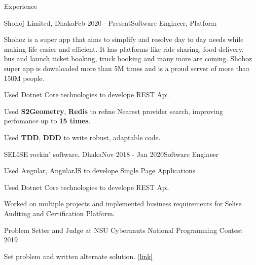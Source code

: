 \documentclass{resume}
\begin{document}
\begin{rSection}{Experience}

\begin{rSubsection}{Shohoj Limited, Dhaka}{Feb 2020 - Present}{Software Engineer, Platform}{}

Shohoz is a super app that aims to simplify and resolve day to day needs while making life easier and efficient. It has platforms like ride sharing, food delivery, bus and launch ticket booking, truck booking and many more are coming. Shohoz super app is downloaded more than 5M times and is a proud server of more than 150M people. \\

\item Used Dotnet Core technologies to develope REST Api.
\item Used \textbf{S2Geometry}, \textbf{Redis} to refine Nearest provider search, improving perfomance up to \textbf{15 times}.
\item Used \textbf{TDD}, \textbf{DDD} to write robust, adaptable code.
\end{rSubsection}

\begin{rSubsection}{SELISE rockin' software, Dhaka}{Nov 2018 - Jan 2020}{Software Engineer}{}
\item Used Angular, AngularJS to develope Single Page Applications
\item Used Dotnet Core technologies to develope REST Api.
\item  Worked on multiple projects and implemented business requirements for Selise Auditing and Certification Platform.
\end{rSubsection}

\begin{rSubsection}{Problem Setter and Judge at NSU Cybernauts National Programming Contest 2019}{}{}{}
\item Set problem and written alternate solution. \href{https://toph.co/c/cybernauts19}{[link]}
\end{rSubsection}

\end{rSection}

\end{document}
